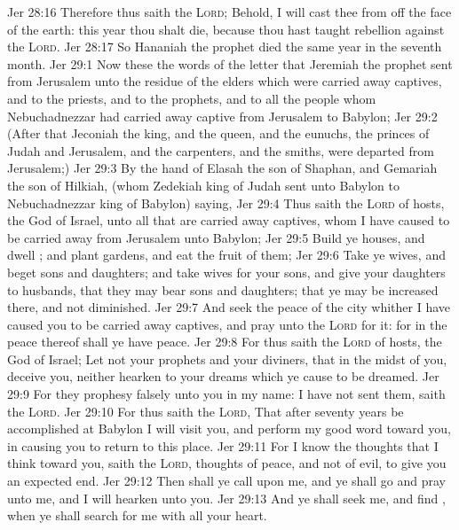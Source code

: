 \vs Jer 28:16 Therefore thus saith the \textsc{Lord}; Behold, I will cast thee from off the face of the earth: this year thou shalt die, because thou hast taught rebellion against the \textsc{Lord}.
\vs Jer 28:17 So Hananiah the prophet died the same year in the seventh month.
\vs Jer 29:1 Now these  the words of the letter that Jeremiah the prophet sent from Jerusalem unto the residue of the elders which were carried away captives, and to the priests, and to the prophets, and to all the people whom Nebuchadnezzar had carried away captive from Jerusalem to Babylon;
\vs Jer 29:2 (After that Jeconiah the king, and the queen, and the eunuchs, the princes of Judah and Jerusalem, and the carpenters, and the smiths, were departed from Jerusalem;)
\vs Jer 29:3 By the hand of Elasah the son of Shaphan, and Gemariah the son of Hilkiah, (whom Zedekiah king of Judah sent unto Babylon to Nebuchadnezzar king of Babylon) saying,
\vs Jer 29:4 Thus saith the \textsc{Lord} of hosts, the God of Israel, unto all that are carried away captives, whom I have caused to be carried away from Jerusalem unto Babylon;
\vs Jer 29:5 Build ye houses, and dwell ; and plant gardens, and eat the fruit of them;
\vs Jer 29:6 Take ye wives, and beget sons and daughters; and take wives for your sons, and give your daughters to husbands, that they may bear sons and daughters; that ye may be increased there, and not diminished.
\vs Jer 29:7 And seek the peace of the city whither I have caused you to be carried away captives, and pray unto the \textsc{Lord} for it: for in the peace thereof shall ye have peace.
\vs Jer 29:8 For thus saith the \textsc{Lord} of hosts, the God of Israel; Let not your prophets and your diviners, that  in the midst of you, deceive you, neither hearken to your dreams which ye cause to be dreamed.
\vs Jer 29:9 For they prophesy falsely unto you in my name: I have not sent them, saith the \textsc{Lord}.
\vs Jer 29:10 For thus saith the \textsc{Lord}, That after seventy years be accomplished at Babylon I will visit you, and perform my good word toward you, in causing you to return to this place.
\vs Jer 29:11 For I know the thoughts that I think toward you, saith the \textsc{Lord}, thoughts of peace, and not of evil, to give you an expected end.
\vs Jer 29:12 Then shall ye call upon me, and ye shall go and pray unto me, and I will hearken unto you.
\vs Jer 29:13 And ye shall seek me, and find , when ye shall search for me with all your heart.
